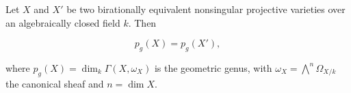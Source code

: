 Let $X$ and $X'$ be two birationally equivalent nonsingular projective varieties over an algebraically closed field $k$. Then

$$p_g(X) = p_g(X'),$$

where $p_g(X) = \dim_k \Gamma(X, \omega_X)$ is the geometric genus, with $\omega_X = \bigwedge^n \Omega_{X/k}$ the canonical sheaf and $n = \dim X$.
